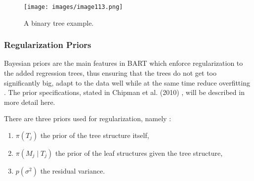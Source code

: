 \documentclass{usiinftr}
\begin{document}
\begin{figure}[h!] 
\centering
\texttt{[image: images/image113.png]}
\caption{A binary tree example.}
\label{bintree}
\end{figure}

\subsubsection{Regularization Priors}\label{prior}
Bayesian priors are the main features in BART which enforce regularization to the added regression trees, thus ensuring that the trees do not get too significantly big, adapt to the data well while at the same time reduce overfitting \cite{7}. The prior specifications, stated in Chipman et al. (2010) \cite{7}, will be described in more detail here.

There are three priors used for regularization, namely \cite{7}:
\begin{enumerate}
\item $\pi(T_j)$ the prior of the tree structure itself,
\item $\pi(M_j \mid T_j)$ the prior of the leaf structures given the tree structure, 
\item $p(\sigma^2)$ the residual variance.
\end{enumerate}
\end{document}
